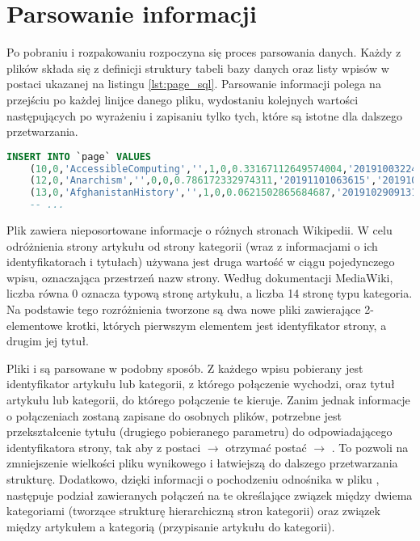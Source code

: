 \section{Parsowanie informacji}
\label{sec:data-parsing}
Po pobraniu i rozpakowaniu rozpoczyna się proces parsowania danych. Każdy z plików  składa się z definicji struktury tabeli bazy danych oraz listy wpisów w postaci ukazanej na listingu \ref{lst:page_sql}. Parsowanie informacji polega na przejściu po każdej linijce danego pliku, wydostaniu kolejnych wartości następujących po wyrażeniu  i zapisaniu tylko tych, które są istotne dla dalszego przetwarzania.

\begin{lstlisting}[language=SQL,frame=single,caption={Fragment pliku \lstinline{enwiki-20191101-page.sql} zawierający dane o stronach},label=lst:page_sql]
INSERT INTO `page` VALUES
    (10,0,'AccessibleComputing','',1,0,0.33167112649574004,'20191003224230','20190105021557',854851586,94,'wikitext',NULL),
    (12,0,'Anarchism','',0,0,0.786172332974311,'20191101063615','20191031183024',923631615,104479,'wikitext',NULL),
    (13,0,'AfghanistanHistory','',1,0,0.0621502865684687,'20191029091312','20190618192734',783865149,90,'wikitext',NULL),
    -- ...
\end{lstlisting}

Plik  zawiera nieposortowane informacje o różnych stronach Wikipedii. W celu odróżnienia strony artykułu od strony kategorii (wraz z informacjami o ich identyfikatorach i tytułach) używana jest druga wartość w ciągu pojedynczego wpisu, oznaczająca przestrzeń nazw strony. Według dokumentacji MediaWiki, liczba równa 0 oznacza typową stronę artykułu, a liczba 14 stronę typu kategoria. Na podstawie tego rozróżnienia tworzone są dwa nowe pliki zawierające 2-elementowe krotki, których pierwszym elementem jest identyfikator strony, a drugim jej tytuł.

Pliki  i  są parsowane w podobny sposób. Z każdego wpisu pobierany jest identyfikator artykułu lub kategorii, z którego połączenie wychodzi, oraz tytuł artykułu lub kategorii, do którego połączenie te kieruje. Zanim jednak informacje o połączeniach zostaną zapisane do osobnych plików, potrzebne jest przekształcenie tytułu (drugiego pobieranego parametru) do odpowiadającego identyfikatora strony, tak aby z postaci  \(\rightarrow\)  otrzymać postać  \(\rightarrow\) . To pozwoli na zmniejszenie wielkości pliku wynikowego i łatwiejszą do dalszego przetwarzania strukturę. Dodatkowo, dzięki informacji o pochodzeniu odnośnika w pliku , następuje podział zawieranych połączeń na te określające związek między dwiema kategoriami (tworzące strukturę hierarchiczną stron kategorii) oraz związek między artykułem a kategorią (przypisanie artykułu do kategorii).

